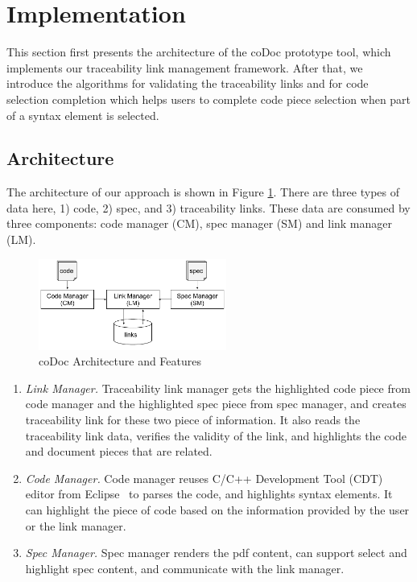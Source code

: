 \section{Implementation}
\label{sec:implementation}

This section first presents the architecture of the coDoc prototype tool, which implements our traceability link management framework. After that, we introduce the algorithms for validating the traceability links and for code selection completion which helps users to complete code piece selection when part of a syntax element is selected.

\subsection{Architecture}

The architecture of our approach is shown in Figure \ref{fig:architecture}.
There are three types of data here, 1) code, 2) spec, and 3) traceability links.
These data are consumed by three components: code manager (CM), spec manager (SM) and link manager (LM).
\begin{figure}
\begin{center}
\includegraphics[width=0.55\textwidth]{architecture}
\caption{coDoc Architecture and Features}
\label{fig:architecture}
\end{center}
\end{figure}
\begin{enumerate}
\item \textit{Link Manager.} Traceability link manager gets the highlighted code piece from code manager and the highlighted spec piece from spec manager, and creates traceability link for these two piece of information. It also reads the traceability link data, verifies the validity of the link,
and highlights the code and document pieces that are related.
\item \textit{Code Manager.} Code manager reuses C/C++ Development Tool (CDT) editor from Eclipse~\cite{Eclipse} to parses the code,
and highlights syntax elements. It can highlight the piece of code based on the information provided by the user or the link manager.
\item \textit{Spec Manager.} Spec manager renders the pdf content, can support select and highlight spec content, and communicate with the link manager.
\end{enumerate}

